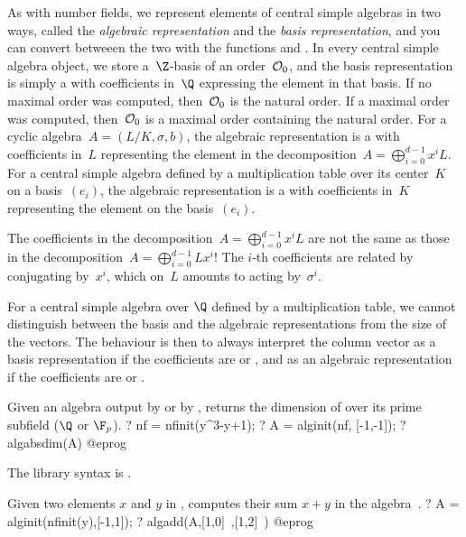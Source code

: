 As with number fields, we represent elements of central simple algebras
in two ways, called the \emph{algebraic representation} and the \emph{basis
representation}, and you can convert betweeen the two with the functions
 and . In every central simple algebra
object, we store a~$\Z$-basis of an order~${\cal O}_0$, and the basis
representation is simply a  with coefficients in~$\Q$ expressing the
element in that basis. If no maximal order was computed, then~${\cal O}_0$ is
the natural order. If a maximal order was computed, then~${\cal O}_0$ is a
maximal order containing the natural order. For a cyclic algebra~$A =
(L/K,\sigma,b)$, the algebraic representation is a  with coefficients
in~$L$ representing the element in the decomposition~$A =
\bigoplus_{i=0}^{d-1}x^iL$. For a central simple algebra defined by a
multiplication table over its center~$K$ on a basis~$(e_i)$, the algebraic
representation is a  with coefficients in~$K$ representing the element
on the basis~$(e_i)$.

 The coefficients in the decomposition~$A =
\bigoplus_{i=0}^{d-1}x^iL$ are not the same as those in the decomposition~$A
= \bigoplus_{i=0}^{d-1}Lx^i$! The $i$-th coefficients are related by
conjugating by~$x^i$, which on~$L$ amounts to acting by~$\sigma^i$.

 For a central simple algebra over $\Q$ defined by a
multiplication table, we cannot distinguish between the basis and the algebraic
representations from the size of the vectors. The behaviour is then to always
interpret the column vector as a basis representation if the coefficients are
 or , and as an algebraic representation if the coefficients
are  or .


\label{se:algabsdim}
Given an algebra  output by  or by
, returns the dimension of  over its prime subfield
($\Q$ or $\F_p$).
\bprog
? nf = nfinit(y^3-y+1);
? A = alginit(nf, [-1,-1]);
? algabsdim(A)
@eprog

The library syntax is .

\label{se:algadd}
Given two elements $x$ and $y$ in , computes their sum $x+y$ in
the algebra~.
\bprog
? A = alginit(nfinit(y),[-1,1]);
? algadd(A,[1,0]~,[1,2]~)
@eprog

